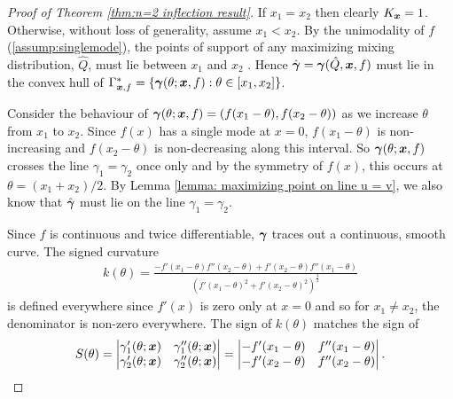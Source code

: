 		\label{sec:proof of n=2 inflection result}
		\begin{proof}[Proof of Theorem \ref{thm:n=2 inflection result}]
			If $x_1 = x_2$ then clearly $K_{\bm{{x}}} = 1$. Otherwise, without loss of generality, assume $x_1 < x_2$. By the unimodality of $f$ (\ref{assump:singlemode}), the points of support of any maximizing mixing distribution, $\hat{Q}$, must lie between $x_1$ and $x_2$ \cite[Proposition 25]{Lindsay1995-sq}. Hence $\hat{{\bm{{\gamma}}}} = {\bm{{\gamma}}}(\hat{Q}, {\bm{{x}}}, f)$ must lie in the convex hull of $\Gamma^*_{{\bm{{x}}}, f} = \{{\bm{{\gamma}}}(\theta; {\bm{{x}}}, f) : \theta \in [x_1, x_2]\}$. 

			Consider the behaviour of ${\bm{{\gamma}}}(\theta; {\bm{{x}}}, f) = (f(x_1 - \theta), f(x_2 - \theta))$ as we increase $\theta$ from $x_1$ to $x_2$. Since $f(x)$ has a single mode at $x = 0$, $f(x_1 - \theta)$ is non-increasing and $f(x_2 - \theta)$ is non-decreasing along this interval. So ${\bm{{\gamma}}}(\theta;{\bm{{x}}}, f)$ crosses the line $\gamma_1 = \gamma_2$ once only and by the symmetry of $f(x)$, this occurs at $\theta = (x_1 + x_2)/2$. By Lemma \ref{lemma: maximizing point on line u = v}, we also know that $\hat{{\bm{{\gamma}}}}$ must lie on the line $\gamma_1 = \gamma_2$.

			Since $f$ is continuous and twice differentiable, ${\bm{{\gamma}}}$ traces out a continuous, smooth curve. The signed curvature
			\begin{align}
				k(\theta) = \frac{-f'(x_1 - \theta)f''(x_2 - \theta) + f'(x_2 - \theta)f''(x_1 - \theta)}{(f'(x_1 - \theta)^2 + f'(x_2 - \theta)^2)^{\frac{3}{2}}}
			\end{align}
			is defined everywhere since $f'(x)$ is zero only at $x = 0$ and so for $x_1 \neq x_2$, the denominator is non-zero everywhere. The sign of $k(\theta)$ matches the sign of
			\begin{equation}
				S(\theta) = 
				\begin{vmatrix}
					\gamma_1'(\theta;{\bm{{x}}})&\gamma_1''(\theta;{\bm{{x}}})\\
					\gamma_2'(\theta;{\bm{{x}}})&\gamma_2''(\theta;{\bm{{x}}})
				\end{vmatrix} = 
				\begin{vmatrix}
					-f'(x_1 - \theta) & f''(x_1 - \theta)\\
					-f'(x_2 - \theta) & f''(x_2 - \theta)
				\end{vmatrix}.
			\end{equation}


\end{proof}
